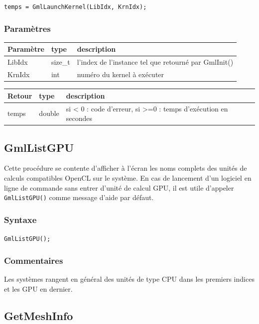 \documentclass[a4paper,12pt]{article}
\begin{document}
{\tt temps = GmlLaunchKernel(LibIdx, KrnIdx);}

\subsubsection*{Paramètres}

\begin{tabular}{|m{2cm}|m{1.5cm}|m{10.5cm}|}
\hline
Paramètre  & type    & description \\
\hline
LibIdx     & size\_t & l'index de l'instance tel que retourné par GmlInit() \\
\hline
KrnIdx     & int     & numéro du kernel à exécuter \\
\hline
\end{tabular}

\medskip

\begin{tabular}{|m{2cm}|m{1.5cm}|m{10.5cm}|}
\hline
Retour     & type   & description \\
\hline
temps      & double & si < 0 : code d'erreur, si >=0 : temps d'exécution en secondes \\
\hline
\end{tabular}


\subsection{GmlListGPU}

Cette procédure se contente d'afficher à l'écran les noms complets des unités de calculs compatibles OpenCL sur le système.
En cas de lancement d'un logiciel en ligne de commande sans entrer d'unité de calcul GPU, il est utile d'appeler {\tt GmlListGPU()} comme message d'aide par défaut.

\subsubsection*{Syntaxe}

{\tt GmlListGPU();}

\subsubsection*{Commentaires}
Les systèmes rangent en général des unités de type CPU dans les premiers indices et les GPU en dernier.


\subsection{GetMeshInfo}
\end{document}

